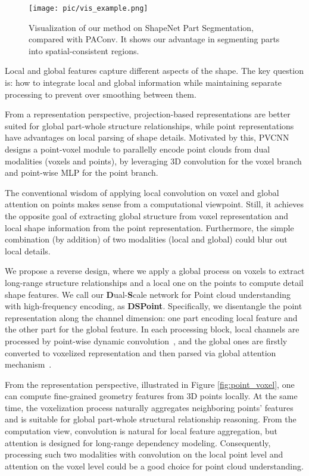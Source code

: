\documentclass[sigconf]{acmart}
\begin{document}
\begin{figure}[tb]
  \centering
\texttt{[image: pic/vis\_example.png]}
  \caption{Visualization of our method on ShapeNet\cite{wu20153d} Part Segmentation, compared with PAConv\cite{xu2021paconv}. It shows our advantage in segmenting parts into spatial-consistent regions.}
    \label{fig:example}
    \vspace{-0.5cm}
\end{figure}

Local and global features capture different aspects of the shape.  The key question is: how to integrate local and global information while maintaining separate processing to prevent over smoothing between them. 

From a representation perspective, projection-based representations are better suited for global part-whole structure relationships, while point representations have advantages on local parsing of shape details.  
Motivated by this, PVCNN~\cite{liu2019point} designs a point-voxel module to parallelly encode point clouds from dual modalities (voxels and points), by leveraging 3D convolution for the voxel branch and point-wise MLP for the point branch. 

The conventional wisdom of applying local convolution on voxel and global attention on points makes sense from a computational viewpoint. Still, it achieves the opposite goal of extracting global structure from voxel representation and local shape information from the point representation. Furthermore, the simple combination (by addition) of two modalities (local and global)  could blur out local details.  

We propose a reverse design, where we apply a global process on voxels to extract long-range structure relationships and a local one on the points to compute detail shape features.  We call our \textbf{D}ual-\textbf{S}cale network for Point cloud understanding with high-frequency encoding, as \textbf{DSPoint}. Specifically, we disentangle the point representation along the channel dimension: one 
part encoding local feature and the other part for the global feature. In each processing block, local channels are processed by point-wise dynamic convolution~\cite{xu2021paconv}, and the global ones are firstly converted to voxelized representation and then parsed via global attention mechanism~\cite{bahdanau2014neural}. 

From the representation perspective, illustrated in Figure \ref{fig:point_voxel}, one can compute fine-grained geometry features from 3D points locally. At the same time, the voxelization process naturally aggregates neighboring points' features and is suitable for global part-whole structural relationship reasoning. From the computation view, convolution is natural for local feature aggregation, but attention is designed for long-range dependency modeling.  Consequently, processing such two modalities with convolution on the local point level and attention on the voxel level could be a good choice for point cloud understanding. 
\end{document}
